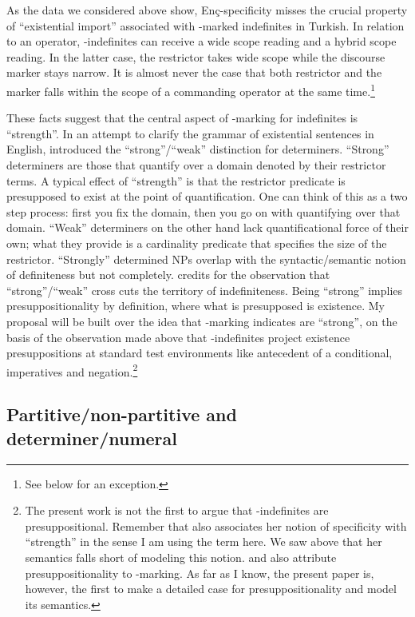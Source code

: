 \documentclass[11pt,a4paper]{article}
\newcommand{\encspec}{Enç-specific}
\begin{document}
As the data we considered above show, \encspec{ity} misses the crucial
property of ``existential import'' associated with \acc-marked
indefinites in Turkish.  In relation to an operator,
\acc-indefinites can receive a wide scope reading and a hybrid scope
reading. In the latter case, the restrictor takes wide scope while the
discourse marker stays narrow. It is almost never the case that both
restrictor and the marker falls within the scope of a commanding
operator at the same time.\footnote{See below for an exception.} 

These facts suggest that the central aspect of \acc-marking for
indefinites is ``strength''. In an attempt to clarify the grammar of
existential sentences in English, \cite{milsark77} introduced the
``strong''/``weak'' distinction for determiners. ``Strong''
determiners are those that quantify over a domain denoted by their
restrictor terms. A typical effect of ``strength'' is that the
restrictor predicate is presupposed to exist at the point of
quantification. One can think of this as a two step process: first you
fix the domain, then you go on with quantifying over that domain.
``Weak'' determiners on the other hand lack quantificational force of
their own; what they provide is a cardinality predicate that specifies
the size of the restrictor.  ``Strongly'' determined NPs overlap with
the syntactic/semantic notion of definiteness but not completely.
 credits  for the observation that
``strong''/``weak'' cross cuts the territory of indefiniteness.  Being
``strong'' implies presuppositionality by definition, where what is
presupposed is existence. My proposal will be built over the idea
that \acc-marking indicates are ``strong'', on the basis of
the observation made above that \acc-indefinites project existence
presuppositions at standard test environments like antecedent of a
conditional, imperatives and negation.\footnote{The present work is
		not the first to argue that \acc-indefinites are
		presuppositional. Remember that  also associates
		her notion of specificity with ``strength'' in the sense I am
		using the term here. We saw above that her semantics falls
		short of modeling this notion.   and
		 also attribute presuppositionality to \acc-marking.
		As far as I know, the present paper is, however, the first to make a
		detailed case for presuppositionality and model its semantics.}



\subsection{Partitive/non-partitive and determiner/numeral}
\end{document}
